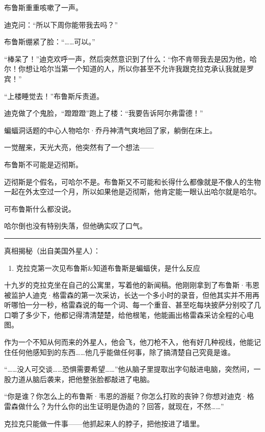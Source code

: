 \documentclass[../main]{subfiles}
\begin{document}
布鲁斯重重咳嗽了一声。

迪克问：“所以下周你能带我去吗？”

布鲁斯绷紧了脸：“……可以。”

“棒呆了！”迪克欢呼一声，然后突然意识到了什么：“你不肯带我去是因为他，哈尔！你想让哈尔当第一个知道的人，所以你甚至不允许我跟克拉克承认我就是罗宾！”

“上楼睡觉去！”布鲁斯斥责道。

迪克做了个鬼脸，“蹬蹬蹬”跑上了楼：“我要告诉阿尔弗雷德！”

蝙蝠洞话题的中心人物哈尔·乔丹神清气爽地回了家，躺倒在床上。

一觉醒来，天光大亮，他突然有了一个想法——

布鲁斯不可能是迈彻斯。

迈彻斯是个假名，可哈尔不是。布鲁斯又不可能和长得什么都像就是不像人的生物一起在外太空过一个月，所以如果他是迈彻斯，他肯定能一眼认出哈尔就是哈尔。

可布鲁斯什么都没说。

哈尔倒也没有特别失落，但他确实叹了口气。

\begin{center}\rule{0.5\linewidth}{0.5pt}\end{center}

真相揭秘（出自美国外星人）：

\begin{enumerate}
    \def\labelenumi{\arabic{enumi}.}
    \item
          克拉克第一次见布鲁斯\&知道布鲁斯是蝙蝠侠，是什么反应
\end{enumerate}

十九岁的克拉克坐在自己的公寓里，写着他的新闻稿。他刚刚拿到了布鲁斯·韦恩被监护人迪克·格雷森的第一次采访，长达一个多小时的录音，但他其实并不用再听哪怕一分一秒，格雷森说的每一个词、每一个重音、甚至吃每块披萨分别咬了几口嚼了多少下，他都记得清清楚楚，给他根笔，他能画出格雷森采访全程的心电图。

作为一个不知从何而来的外星人，他会飞，他刀枪不入，他有好几种视线，他能记住任何他感知到的东西……他几乎能做任何事，除了搞清楚自己究竟是谁。

“……没人可交谈……恐惧需要希望\ldots\ldots”他从脑子里提取出字句敲进电脑，突然间，一股力道从脑后袭来，把他整张脸都敲进了电脑。

“你是谁？你怎么上的布鲁斯·韦恩的游艇？你怎么打败的丧钟？你想对迪克·格雷森做什么？为什么你的出生证明是伪造的？回答，就现在，不然\ldots\ldots”

克拉克只能做一件事——他抓起来人的脖子，把他按进了墙里。
\end{document}
